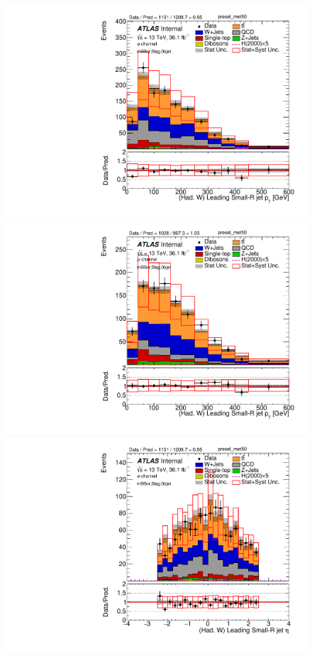 \begin{figure}[!ht]
\begin{center}
\includegraphics[scale=0.33]{./figures/boosted/PlotByChannels/DataMC_2tag_0bjet_mbbcr_elec_presel_met50_LightJet1Pt} 
\includegraphics[scale=0.33]{./figures/boosted/PlotByChannels/DataMC_2tag_0bjet_mbbcr_muon_presel_met50_LightJet1Pt} 
\includegraphics[scale=0.33]{./figures/boosted/PlotByChannels/DataMC_2tag_0bjet_mbbcr_elec_presel_met50_LightJet1Eta}                                                                               

\end{center}
\end{figure}
